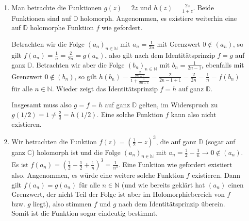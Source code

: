 \documentclass[a4paper]{article}
\begin{document}
\begin{enumerate}[label=(\alph*)]
	\item Man betrachte die Funktionen $g(z) = 2z$ und $h(z) = \frac{2z}{1 + z}$.
	Beide Funktionen sind auf $\mathds{D}$ holomorph.
	Angenommen, es existiere weiterhin eine auf $\mathds{D}$ holomorphe Funktion $f$ wie gefordert.

	Betrachten wir die Folge $(a_n)_{n \in \mathds{N}}$ mit $a_n = \frac{1}{2n}$ mit Grenzwert $0 \notin (a_n)$, so gilt $f(a_n) = \frac{1}{n} = \frac{2}{2n} = g(a_n)$, also gilt nach dem Identitätsprinzip $f = g$ auf ganz $\mathds{D}$.
	Betrachten wir aber die Folge $(b_n)_{n \in \mathds{N}}$ mit $b_n = \frac{1}{2n-1}$, ebenfalls mit Grenzwert $0 \notin (b_n)$, so gilt $h(b_n) = \frac{\frac{2}{2n - 1}}{1 + \frac{1}{2n -1}} = \frac{2}{2n-1 + 1} = \frac{2}{2n} =  \frac{1}{n} = f(b_n)$ für alle $n \in \mathds{N}$.
	Wieder zeigt das Identitätsprinzip $f = h$ auf ganz $\mathds{D}$.

	Insgesamt muss also $g = f = h$ auf ganz $\mathds{D}$ gelten, im Widerspruch zu $g(1/2) = 1 \neq \frac{2}{3} = h(1/2)$.
	Eine solche Funktion $f$ kann also nicht existieren.
	\item Wir betrachten die Funktion $f(z) = (\frac{1}{2} - z)^3$, die auf ganz $\mathds{D}$ (sogar auf ganz $\mathds{C}$) holomorph ist und die Folge $(a_n)_{n \in \mathds{N}}$ mit $a_n = \frac{1}{2} - \frac{1}{n} \to 0 \notin (a_n)$.
	Es ist $f(a_n) = (\frac{1}{2} - \frac{1}{2} + \frac{1}{n})^3 = \frac{1}{n^3}$.
	Eine Funktion wie gefordert existiert also.
	Angenommen, es würde eine weitere solche Funktion $f$ existieren.
	Dann gilt $f(a_n) = g(a_n)$ für alle $n \in \mathds{N}$ (und wie bereits geklärt hat $(a_n)$ einen Grenzwert, der nicht Teil der Folge ist aber im Holomorphiebereich von $f$ bzw. $g$ liegt), also stimmen $f$ und $g$ nach dem Identitätsprinzip überein.
	Somit ist die Funktion sogar eindeutig bestimmt.
\end{enumerate}
\end{document}

